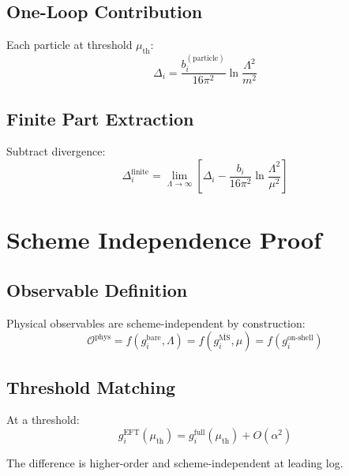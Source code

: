 \documentclass[11pt,a4paper]{article}
\begin{document}
\subsection{One-Loop Contribution}
\label{app:one-loop}

Each particle at threshold $\mu_{\text{th}}$:
\begin{equation}
\label{eq:threshold-particle}
\Delta_i = \frac{b_i^{(\text{particle})}}{16\pi^2}\ln\frac{\Lambda^2}{m^2}
\end{equation}

\subsection{Finite Part Extraction}
\label{app:finite-extract}

Subtract divergence:
\begin{equation}
\label{eq:finite-extract}
\Delta_i^{\text{finite}} = \lim_{\Lambda\to\infty}\left[\Delta_i - \frac{b_i}{16\pi^2}\ln\frac{\Lambda^2}{\mu^2}\right]
\end{equation}

\section{Scheme Independence Proof}
\label{app:scheme-proof}

\subsection{Observable Definition}
\label{app:obs-def}

Physical observables are scheme-independent by construction:
\begin{equation}
\label{eq:obs-scheme}
\mathcal{O}^{\text{phys}} = f(g_i^{\text{bare}}, \Lambda) = f(g_i^{\overline{\text{MS}}}, \mu) = f(g_i^{\text{on-shell}})
\end{equation}

\subsection{Threshold Matching}
\label{app:threshold-match}

At a threshold:
\begin{equation}
\label{eq:threshold-match}
g_i^{\text{EFT}}(\mu_{\text{th}}) = g_i^{\text{full}}(\mu_{\text{th}}) + O(\alpha^2)
\end{equation}

The difference is higher-order and scheme-independent at leading log.
\end{document}
